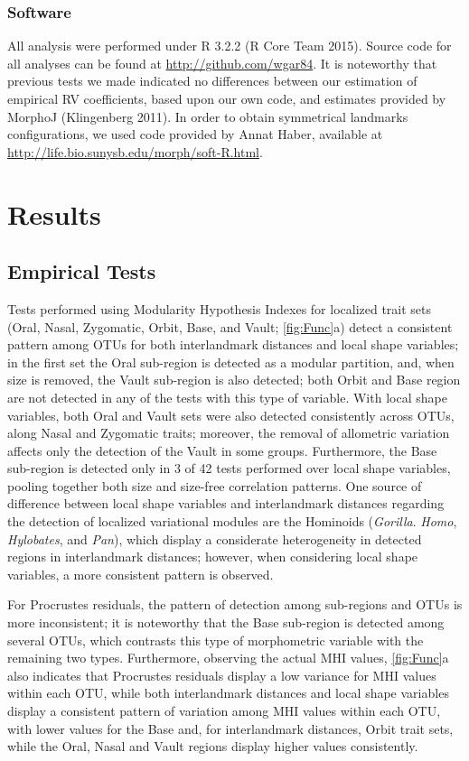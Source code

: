 \documentclass[12pt,]{article}
\begin{document}
\subsubsection{Software}\label{software}

All analysis were performed under R 3.2.2 (R Core Team 2015). Source
code for all analyses can be found at \url{http://github.com/wgar84}. It
is noteworthy that previous tests we made indicated no differences
between our estimation of empirical RV coefficients, based upon our own
code, and estimates provided by MorphoJ (Klingenberg 2011). In order to
obtain symmetrical landmarks configurations, we used code provided by
Annat Haber, available at
\url{http://life.bio.sunysb.edu/morph/soft-R.html}.

\section{Results}\label{results}

\subsection{Empirical Tests}\label{empirical-tests}

Tests performed using Modularity Hypothesis Indexes for localized trait
sets (Oral, Nasal, Zygomatic, Orbit, Base, and Vault;
\autoref{fig:Func}a) detect a consistent pattern among OTUs for both
interlandmark distances and local shape variables; in the first set the
Oral sub-region is detected as a modular partition, and, when size is
removed, the Vault sub-region is also detected; both Orbit and Base
region are not detected in any of the tests with this type of variable.
With local shape variables, both Oral and Vault sets were also detected
consistently across OTUs, along Nasal and Zygomatic traits; moreover,
the removal of allometric variation affects only the detection of the
Vault in some groups. Furthermore, the Base sub-region is detected only
in 3 of 42 tests performed over local shape variables, pooling together
both size and size-free correlation patterns. One source of difference
between local shape variables and interlandmark distances regarding the
detection of localized variational modules are the Hominoids
(\emph{Gorilla}. \emph{Homo}, \emph{Hylobates}, and \emph{Pan}), which
display a considerate heterogeneity in detected regions in interlandmark
distances; however, when considering local shape variables, a more
consistent pattern is observed.

For Procrustes residuals, the pattern of detection among sub-regions and
OTUs is more inconsistent; it is noteworthy that the Base sub-region is
detected among several OTUs, which contrasts this type of morphometric
variable with the remaining two types. Furthermore, observing the actual
MHI values, \autoref{fig:Func}a also indicates that Procrustes residuals
display a low variance for MHI values within each OTU, while both
interlandmark distances and local shape variables display a consistent
pattern of variation among MHI values within each OTU, with lower values
for the Base and, for interlandmark distances, Orbit trait sets, while
the Oral, Nasal and Vault regions display higher values consistently.
\end{document}
